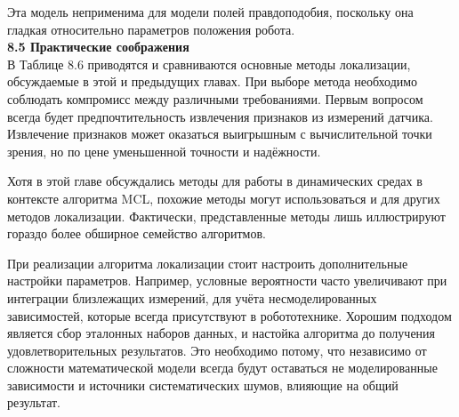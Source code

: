 \documentclass[10pt,a4paper]{article}
\begin{document}
Эта модель неприменима для модели полей правдоподобия, поскольку она гладкая относительно параметров положения робота.\\ 

\textbf{8.5	Практические соображения}\\

В Таблице 8.6 приводятся и сравниваются основные методы локализации, обсуждаемые в этой и предыдущих главах. При выборе метода необходимо соблюдать компромисс между различными требованиями. Первым вопросом всегда будет предпочтительность извлечения признаков из измерений датчика. Извлечение признаков может оказаться выигрышным с вычислительной точки зрения, но по цене уменьшенной точности и надёжности.

Хотя в этой главе обсуждались методы для работы в динамических средах в контексте алгоритма MCL, похожие методы могут использоваться и для других методов локализации. Фактически, представленные методы лишь иллюстрируют гораздо более обширное семейство алгоритмов. 

При реализации алгоритма локализации стоит настроить дополнительные настройки параметров. Например, условные вероятности часто увеличивают при интеграции близлежащих измерений, для учёта несмоделированных зависимостей, которые всегда присутствуют в робототехнике. Хорошим подходом является сбор эталонных наборов данных, и настойка алгоритма до получения удовлетворительных результатов. Это необходимо потому, что независимо от сложности математической модели всегда будут оставаться не моделированные зависимости и источники систематических шумов, влияющие на общий результат.   
\end{document}
